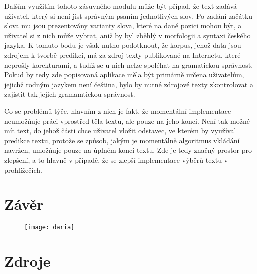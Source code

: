 \documentclass[a4paper,11pt]{article}
\begin{document}
Dalším využitím tohoto zásuvného modulu může být případ, že text zadává uživatel, který si není jist správným psaním jednotlivých slov. Po zadání začátku slova mu jsou prezentovány varianty slova, které na dané pozici mohou být, a uživatel si z nich může vybrat, aniž by byl zběhlý v morfologii a syntaxi českého jazyka. K tomuto bodu je však nutno podotknout, že korpus, jehož data jsou zdrojem k tvorbě predikcí, má za zdroj texty publikované na Internetu, které neprošly korekturami, a tudíž se u nich nelze spoléhat na gramatickou správnost. Pokud by tedy zde popisovaná aplikace měla být primárně určena uživatelům, jejichž rodným jazykem není čeština, bylo by nutné zdrojové texty zkontrolovat a zajistit tak jejich gramamtickou správnost.

Co se problémů týče, hlavním z nich je fakt, že momentální implementace neumožňuje práci vprostřed těla textu, ale pouze na jeho konci. Není tak možné mít text, do jehož části chce uživatel vložit odstavec, ve kterém by využíval predikce textu, protože se způsob, jakým je momentálně algoritmus vkládání navržen, umožňuje pouze na úplném konci textu. Zde je tedy značný prostor pro zlepšení, a to hlavně v případě, že se zlepší implementace výběrů textu v prohlížečích.


\section{Závěr}

\begin{figure}[h]
	\centering
	\texttt{[image: daria]}
\end{figure}
\section{Zdroje}



\end{document}
